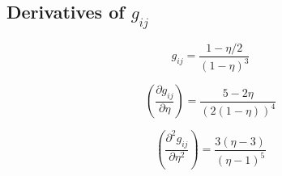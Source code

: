 \documentclass[english]{../thermomemo/thermomemo}
\newcommand*{\pder}[2]{\left(\frac{\partial #1}{\partial #2}\right)}
\newcommand*{\pdder}[2]{\left(\frac{\partial^2 #1}{\partial #2^2}\right)}
\newcommand{\z}{\zeta}
\newcommand{\lp}{\left(}
\newcommand{\rp}{\right)}
\begin{document}

\subsection{Derivatives of $g_{ij}$}
\begin{equation}
  g_{ij} = \frac{1-\eta/2}{(1-\eta)^3}
\end{equation}

\begin{equation}
  \pder{g_{ij}}{\eta} = \frac{5-2\eta}{(2(1-\eta))^4}
\end{equation}

\begin{equation}
  \pdder{g_{ij}}{\eta} = \frac{3(\eta-3)}{(\eta-1)^5}
\end{equation}


\end{document}
